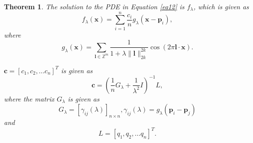 \documentclass[multixcb]{amstext-l}
\theoremstyle{plain}
\newtheorem{theorem}{Theorem}[chapter]
\theoremstyle{definition}
\theoremstyle{definition}
\theoremstyle{remark}
\numberwithin{equation}{chapter}
\begin{document}
\begin{theorem}\label{E-L_solution}
The solution to the PDE in Equation \ref{eq12} is $f_{\lambda}$, which is given as
\begin{equation}
    \label{exp_th}  
  f_{\lambda}(\boldsymbol{x}) = \sum\limits_{i=1}^n \frac{c_i}{n}g_{\lambda}(\boldsymbol{x}-\boldsymbol{p}_i),
 \end{equation}
 where
 \begin{equation}\label{eq22_th}
    g_{\lambda}(\boldsymbol{x}) =  \sum_{\boldsymbol{l}\in\mathbb{Z}^m} \frac{1}{1+\lambda\|\boldsymbol{l}\|_{2k}^{2k}} \cos{\left(2\pi\boldsymbol{l}\cdot\boldsymbol{x}\right)}.
\end{equation}


 $\pmb{c} = [c_1,c_2,...c_n]^T$ is given as \begin{equation}\label{eq28_th}
 \pmb{c} = (\frac{1}{n}G_{\lambda}+\frac{1}{\lambda^2}I)^{-1}L,\end{equation} where the matrix $G_{\lambda}$ is given as 
\begin{equation}\label{eq29_th}
  G_{\lambda} = [\gamma_{ij}(\lambda)]_{n\times n},\gamma_{ij}(\lambda) = g_{\lambda}(\boldsymbol{p}_i-\boldsymbol{p}_j)\end{equation} and $$L = [q_1,q_2,\ldots q_n]^T.$$ 

\end{theorem}
\end{document}
